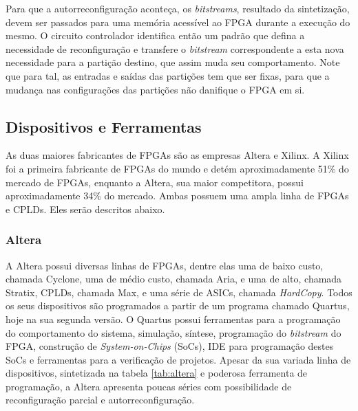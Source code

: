 \documentclass[11pt,a4paper,oneside]{book}
\begin{document}
Para que a autorreconfigura\c{c}\~ao aconte\c{c}a, os \textit{bitstreams}, resultado da sintetiza\c{c}\~ao, devem ser passados para uma mem\'oria acess\'i­vel ao FPGA durante a execu\c{c}\~ao do mesmo.
O circuito controlador identifica ent\~ao um padr\~ao que defina a necessidade de reconfigura\c{c}\~ao e transfere o \textit{bitstream} correspondente a esta nova necessidade para a parti\c{c}\~ao destino, que assim muda seu comportamento.
Note que para tal, as entradas e sa\'i­das das parti\c{c}\~oes tem que ser fixas, para que a mudan\c{c}a nas configura\c{c}\~oes das parti\c{c}\~oes n\~ao danifique o FPGA em si.

\subsection{Dispositivos e Ferramentas}
As duas maiores fabricantes de FPGAs s\~ao as empresas Altera e Xilinx.
A Xilinx foi a primeira fabricante de FPGAs do mundo e det\'em aproximadamente 51\% do mercado de FPGAs, enquanto a Altera, sua maior competitora, possui aproximadamente 34\% do mercado.
Ambas possuem uma ampla linha de FPGAs e CPLDs.
Eles ser\~ao descritos abaixo.

\subsubsection{Altera}
A Altera possui diversas linhas de FPGAs, dentre elas uma de baixo custo, chamada Cyclone, uma de m\'edio custo, chamada Aria, e uma de alto, chamada Stratix, CPLDs, chamada Max, e uma s\'erie de ASICs, chamada \textit{HardCopy}.
Todos os seus dispositivos s\~ao programados a partir de um programa chamado Quartus, hoje na sua segunda vers\~ao.
O Quartus possui ferramentas para a programa\c{c}\~ao do comportamento do sistema, simula\c{c}\~ao, s\'i­ntese, programa\c{c}\~ao do \textit{bitstream} do FPGA, constru\c{c}\~ao de \textit{System-on-Chips} (SoCs), IDE para programa\c{c}\~ao destes SoCs e ferramentas para a verifica\c{c}\~ao de projetos.
Apesar da sua variada linha de dispositivos, sintetizada na tabela \ref{tab:altera} e poderosa ferramenta de programa\c{c}\~ao, a Altera apresenta poucas s\'eries com possibilidade de reconfigura\c{c}\~ao parcial e autorreconfigura\c{c}\~ao.
\end{document}
